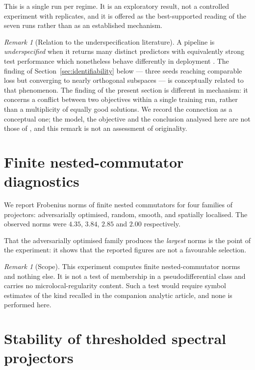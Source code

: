 \documentclass[11pt]{amsart}
\theoremstyle{remark}
\newtheorem{remark}[observation]{Remark}
\begin{document}
This is a single run per regime. It is an exploratory result, not a controlled experiment
with replicates, and it is offered as the best-supported reading of the seven runs rather
than as an established mechanism.

\begin{remark}[Relation to the underspecification literature]
\label{rem:underspecification}
A pipeline is \emph{underspecified} when it returns many distinct predictors with
equivalently strong test performance which nonetheless behave differently in deployment
\cite{DAmourEtAl2022}. The finding of Section~\ref{sec:identifiability} below --- three
seeds reaching comparable loss but converging to nearly orthogonal subspaces --- is
conceptually related to that phenomenon. The finding of the present section is different in
mechanism: it concerns a conflict between two objectives within a single training run,
rather than a multiplicity of equally good solutions. We record the connection as a
conceptual one; the model, the objective and the conclusion analysed here are not those of
\cite{DAmourEtAl2022}, and this remark is not an assessment of originality.
\end{remark}

\section{Finite nested-commutator diagnostics}
\label{sec:nested}

We report Frobenius norms of finite nested commutators for four families of projectors:
adversarially optimised, random, smooth, and spatially localised. The observed norms were
$4.35$, $3.84$, $2.85$ and $2.00$ respectively.

That the adversarially optimised family produces the \emph{largest} norms is the point of
the experiment: it shows that the reported figures are not a favourable selection.

\begin{remark}[Scope]
\label{rem:beals}
This experiment computes finite nested-commutator norms and nothing else. It is not a test
of membership in a pseudodifferential class and carries no microlocal-regularity content.
Such a test would require symbol estimates of the kind recalled in the companion analytic
article, and none is performed here.
\end{remark}

\section{Stability of thresholded spectral projectors}
\label{sec:snapping}
\end{document}
